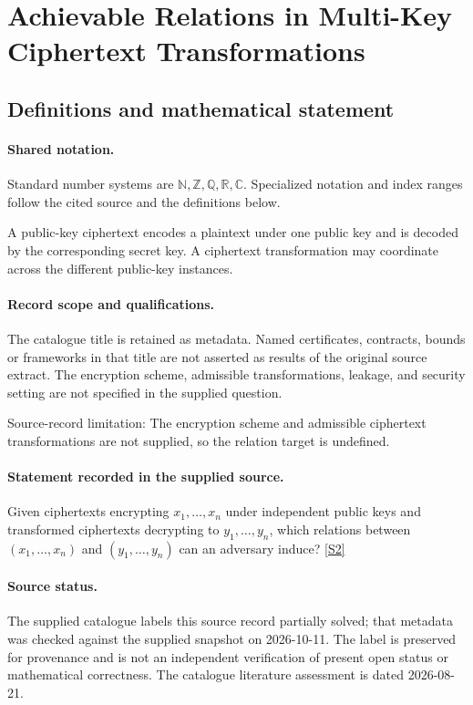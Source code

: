 \documentclass[11pt]{article}
\newcommand{\sref}[2]{\hyperlink{source:#1:#2}{[S#2]}}
\begin{document}
\section{Achievable Relations in Multi-Key Ciphertext Transformations}\label{statement}

\subsection{Definitions and mathematical statement}

\paragraph{Shared notation.}Standard number systems are $\mathbb N,\mathbb Z,\mathbb Q,\mathbb R,\mathbb C$. Specialized notation and index ranges follow the cited source and the definitions below.


A public-key ciphertext encodes a plaintext under one public key and is decoded by the corresponding secret key. A ciphertext transformation may coordinate across the different public-key instances.
\paragraph{Record scope and qualifications.}
The catalogue title is retained as metadata. Named certificates, contracts, bounds or frameworks in that title are not asserted as results of the original source extract.
The encryption scheme, admissible transformations, leakage, and security setting are not specified in the supplied question.

Source-record limitation: The encryption scheme and admissible ciphertext transformations are not supplied, so the relation target is undefined.
\paragraph{Statement recorded in the supplied source.}
Given ciphertexts encrypting $x_1,\ldots,x_n$ under independent public keys and transformed ciphertexts decrypting to $y_1,\ldots,y_n$, which relations between $(x_1,\ldots,x_n)$ and $(y_1,\ldots,y_n)$ can an adversary induce? \sref{statement}{2}
\paragraph{Source status.}
The supplied catalogue labels this source record partially solved; that metadata was checked against the supplied snapshot on 2026-10-11. The label is preserved for provenance and is not an independent verification of present open status or mathematical correctness. The catalogue literature assessment is dated 2026-08-21.
\end{document}
